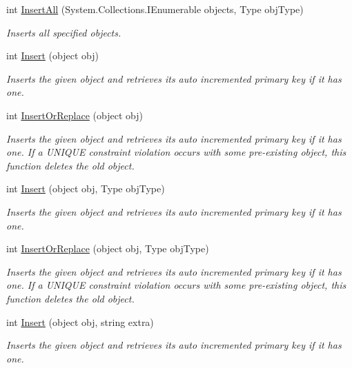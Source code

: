 \begin{DoxyCompactItemize}
int \hyperlink{classSQLite_1_1SQLiteConnection_a08e03803dd01aa67ee56a8e6d184c9d9}{Insert\-All} (System.\-Collections.\-I\-Enumerable objects, Type obj\-Type)
\begin{DoxyCompactList}\small\item\em Inserts all specified objects. \end{DoxyCompactList}\item 
int \hyperlink{classSQLite_1_1SQLiteConnection_a937382b36e6726d12fe6d09f7bfb0ab6}{Insert} (object obj)
\begin{DoxyCompactList}\small\item\em Inserts the given object and retrieves its auto incremented primary key if it has one. \end{DoxyCompactList}\item 
int \hyperlink{classSQLite_1_1SQLiteConnection_a1c16c3dda43037326b7f2afc6c822abd}{Insert\-Or\-Replace} (object obj)
\begin{DoxyCompactList}\small\item\em Inserts the given object and retrieves its auto incremented primary key if it has one. If a U\-N\-I\-Q\-U\-E constraint violation occurs with some pre-\/existing object, this function deletes the old object. \end{DoxyCompactList}\item 
int \hyperlink{classSQLite_1_1SQLiteConnection_a19576a29af1c0891a646ff3e904f2cdc}{Insert} (object obj, Type obj\-Type)
\begin{DoxyCompactList}\small\item\em Inserts the given object and retrieves its auto incremented primary key if it has one. \end{DoxyCompactList}\item 
int \hyperlink{classSQLite_1_1SQLiteConnection_a812215a88043259b6a107994756000ae}{Insert\-Or\-Replace} (object obj, Type obj\-Type)
\begin{DoxyCompactList}\small\item\em Inserts the given object and retrieves its auto incremented primary key if it has one. If a U\-N\-I\-Q\-U\-E constraint violation occurs with some pre-\/existing object, this function deletes the old object. \end{DoxyCompactList}\item 
int \hyperlink{classSQLite_1_1SQLiteConnection_a3ab0fde4b10c4b492b2f5f64535c6d66}{Insert} (object obj, string extra)
\begin{DoxyCompactList}\small\item\em Inserts the given object and retrieves its auto incremented primary key if it has one. \end{DoxyCompactList}\item 

\end{DoxyCompactItemize}
